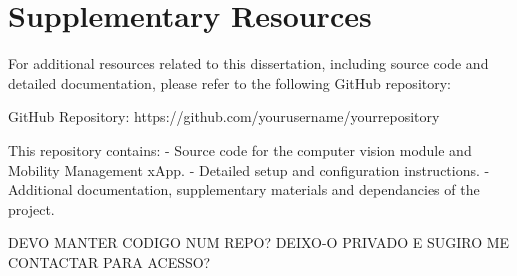 \chapter{Supplementary Resources}\label{ch:resources}

For additional resources related to this dissertation, including source code and detailed documentation, please refer to the following GitHub repository:

GitHub Repository: https://github.com/yourusername/yourrepository

This repository contains:
- Source code for the computer vision module and Mobility Management xApp.
- Detailed setup and configuration instructions.
- Additional documentation, supplementary materials and dependancies of the project.

DEVO MANTER CODIGO NUM REPO? DEIXO-O PRIVADO E SUGIRO ME CONTACTAR PARA ACESSO?


